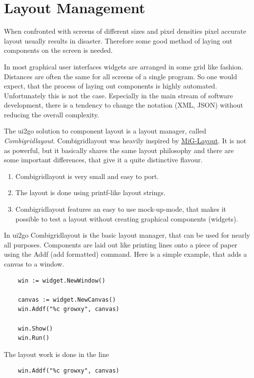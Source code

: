 \section{Layout Management}

When confronted with screens of different sizes and pixel densities
pixel accurate layout usually results in disaster. Therefore some good
method of laying out components on the screen is needed.

In most graphical user interfaces widgets are arranged in some grid like
fashion. Distances are often the same for all screens of a single
program. So one would expect, that the process of laying out components
is highly automated. Unfortunately this is not the case. Especially in
the main stream of software development, there is a tendency to change
the notation (XML, JSON) without reducing the overall complexity.

The ui2go solution to component layout is a layout manager, called
\emph{Combigridlayout}. Combigridlayout was heavily inspired by
\href{http://www.miglayout.com/}{MiG-Layout}. It is not as powerful, but
it basically shares the same layout philosophy and there are some
important differences, that give it a quite distinctive flavour.

\begin{enumerate}
\item
  Combigridlayout is very small and easy to port.
\item
  The layout is done using printf-like layout strings.
\item
  Combigridlayout features an easy to use mock-up-mode, that makes it
  possible to test a layout without creating graphical components
  (widgets).
\end{enumerate}

In ui2go Combigridlayout is the basic layout manager, that can be used
for nearly all purposes. Components are laid out like printing lines
onto a piece of paper using the Addf (add formatted) command. Here is a
simple example, that adds a canvas to a window.

\begin{verbatim}
    win := widget.NewWindow()

    canvas := widget.NewCanvas()
    win.Addf("%c growxy", canvas)

    win.Show()
    win.Run()
\end{verbatim}

The layout work is done in the line

\begin{verbatim}
    win.Addf("%c growxy", canvas)
\end{verbatim}

